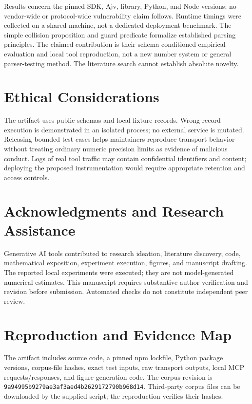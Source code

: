 \documentclass[11pt]{article}
\begin{document}
Results concern the pinned SDK, Ajv, library, Python, and Node versions; no vendor-wide or protocol-wide vulnerability claim follows. Runtime timings were collected on a shared machine, not a dedicated deployment benchmark. The simple collision proposition and guard predicate formalize established parsing principles. The claimed contribution is their schema-conditioned empirical evaluation and local tool reproduction, not a new number system or general parser-testing method. The literature search cannot establish absolute novelty.

\section*{Ethical Considerations}
The artifact uses public schemas and local fixture records. Wrong-record execution is demonstrated in an isolated process; no external service is mutated. Releasing bounded test cases helps maintainers reproduce transport behavior without treating ordinary numeric precision limits as evidence of malicious conduct. Logs of real tool traffic may contain confidential identifiers and content; deploying the proposed instrumentation would require appropriate retention and access controls.

\ifdefined\anonymous\else
\section*{Acknowledgments and Research Assistance}
Generative AI tools contributed to research ideation, literature discovery, code, mathematical exposition, experiment execution, figures, and manuscript drafting. The reported local experiments were executed; they are not model-generated numerical estimates. This manuscript requires substantive author verification and revision before submission. Automated checks do not constitute independent peer review.
\fi




\appendix
\section{Reproduction and Evidence Map}
The artifact includes source code, a pinned npm lockfile, Python package versions, corpus-file hashes, exact test inputs, raw transport outputs, local MCP requests/responses, and figure-generation code. The corpus revision is \texttt{9a94995b9279ae3a\allowbreak f3aed4b262917279\allowbreak 0b968d14}. Third-party corpus files can be downloaded by the supplied script; the reproduction verifies their hashes.
\end{document}
